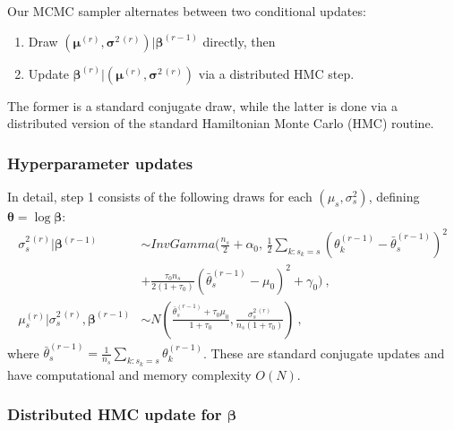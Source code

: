 Our MCMC sampler alternates between two conditional updates:
\begin{enumerate}
 \item Draw $(\bm \mu^{(r)}, \bm \sigma^{2\,(r)}) | \bm \beta^{(r-1)}$ directly, then
 \item Update $\bm \beta^{(r)} | (\bm \mu^{(r)}, \bm \sigma^{2\,(r)})$ via a distributed HMC step.
\end{enumerate}
The former is a standard conjugate draw, while the latter is done via a distributed version of the standard Hamiltonian Monte Carlo (HMC) routine.

\subsubsection{Hyperparameter updates}

In detail, step 1 consists of the following draws for each $(\mu_s, \sigma^2_s)$, defining $\bm \theta = \log \bm \beta$:
\begin{align}
 \sigma_s^{2\,(r)} | \bm \beta^{(r-1)} &\sim InvGamma{\bigg(}\frac{n_s}{2} + \alpha_0,
  \, \frac{1}{2} \sum_{k:s_k = s} (\theta_k^{(r-1)} - \bar{\theta}_s^{(r-1)})^2  \\
\nonumber
  & + \frac{\tau_0 n_s}{2 (1 + \tau_0)} (\bar{\theta}_s^{(r-1)} - \mu_0)^2
  + \gamma_0 {\bigg)} \ , \\
 \mu_s^{(r)} | \sigma_s^{2\,(r)}, \bm \beta^{(r-1)} &\sim N\left( \frac{\bar{\theta}_s^{(r-1)} + \tau_0 \mu_0}{1 + \tau_0}, \frac{\sigma_s^{2\,(r)}}{n_s (1 + \tau_0)} \right) \ ,
\end{align}
where $\bar{\theta}_s^{(r-1)} = \frac{1}{n_s} \sum_{k : s_k = s} \theta_k^{(r-1)}$.
These are standard conjugate updates and have computational and memory complexity $O(N)$.

\subsubsection{Distributed HMC update for \texorpdfstring{$\bm \beta$}{beta}}
\label{supp:nucleosomes:sec:distributedHMC}

